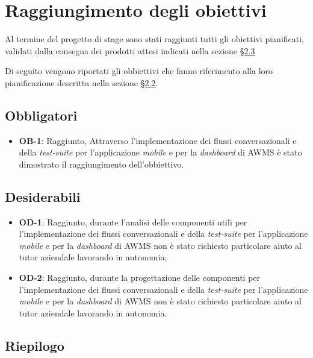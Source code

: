 \section{Raggiungimento degli obiettivi}

Al termine del progetto di stage sono stati raggiunti tutti gli obiettivi pianificati, validati dalla consegna dei prodotti attesi indicati nella sezione \hyperref[cap:prodotti]{§2.3}

Di seguito vengono riportati gli obbiettivi che fanno riferimento alla loro pianificazione descritta nella sezione \hyperref[cap:obbiettivi]{§2.2}.

\subsection*{Obbligatori}
\begin{itemize}
	\item \textbf{OB-1}: Raggiunto, Attraverso l'implementazione dei flussi conversazionali e della \emph{test-suite} per l'applicazione \emph{mobile} e per la \emph{dashboard} di \gls{AWMS} è stato dimostrato il raggiungimento dell'obbiettivo.
\end{itemize}
\subsection*{Desiderabili} 
\begin{itemize}
	\item \textbf{OD-1}: Raggiunto, durante l'analisi delle componenti utili per l'implementazione dei flussi conversazionali e della \emph{test-suite} per l'applicazione \emph{mobile} e per la \emph{dashboard} di \gls{AWMS} non è stato richiesto particolare aiuto al tutor aziendale lavorando in autonomia;
	\item \textbf{OD-2}: Raggiunto, durante la progettazione delle componenti per l'implementazione dei flussi conversazionali e della \emph{test-suite} per l'applicazione \emph{mobile} e per la \emph{dashboard} di \gls{AWMS} non è stato richiesto particolare aiuto al tutor aziendale lavorando in autonomia.
\end{itemize}

\subsection{Riepilogo}

